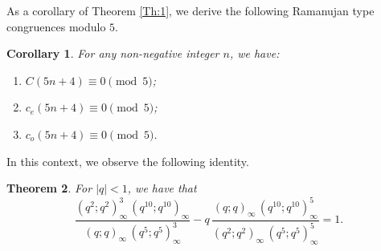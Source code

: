 \documentclass{article}
\newtheorem{theorem}{Theorem}
\newtheorem{corollary}[theorem]{Corollary}
\begin{document}
\medskip

As a corollary of Theorem \ref{Th:1},  we derive the following Ramanujan type congruences modulo $5$.

\medskip
\begin{corollary} \label{Th:2}
    For any non-negative integer $n$, we have:
    \begin{enumerate}
        \item[(a)] %
        $C(5n+4) \equiv 0 \pmod 5$;
        \item[(b)] $c_e(5n+4) \equiv 0 \pmod 5$;
        \item[(c)] $c_o(5n+4) \equiv 0 \pmod 5$.
    \end{enumerate}
\end{corollary}
\medskip

In this context, we observe the following identity.

\medskip
\begin{theorem} \label{Th:3}
    For $|q|<1$, we have that
    $$
    \frac{(q^2;q^2)_\infty^3\, (q^{10};q^{10})_\infty}{(q;q)_\infty\, (q^5;q^5)_\infty^3}-q\,\frac{(q;q)_\infty\, (q^{10};q^{10})_\infty^5}{(q^2;q^2)_\infty\,(q^5;q^5)_\infty^5} = 1.
    $$
\end{theorem}


\medskip
\end{document}
